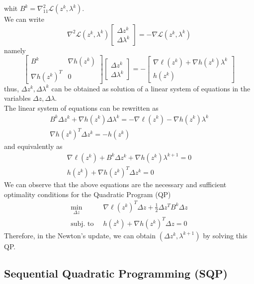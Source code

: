 \documentclass[openany]{book}
\theoremstyle{definition}
\theoremstyle{remark}
\begin{document}
whit $B^k = \nabla_{11}^2 \mathcal{L}(z^k,\lambda^k)$.\\
We can write 
\[
    \nabla^2\mathcal{L}(z^k,\lambda^k)\begin{bmatrix}
        \Delta z^k \\ \Delta \lambda^k
    \end{bmatrix} = -\nabla \mathcal{L}(z^k,\lambda^k)
\]
namely 
\[
    \begin{bmatrix}
        B^k & \nabla h(z^k) \\
        \nabla h(z^k)^T & 0
        \end{bmatrix}  \begin{bmatrix}
        \Delta z^k \\ \Delta \lambda^k
        \end{bmatrix} = -\begin{bmatrix}
        \nabla \ell(z^k)+\nabla h(z^k)\lambda^k \\ h(z^k)
    \end{bmatrix}
\]
thus, $\Delta z^k, \Delta\lambda^k$ can be obtained as solution of a linear system of equations in the variables $\Delta z, \Delta\lambda$.\\
The linear system of equations can be rewritten as 
\begin{gather*}
    B^k\Delta z^k+\nabla h(z^k)\Delta \lambda^k = -\nabla\ell(z^k) - \nabla h(z^k)\lambda^k \\
    \nabla h(z^k)^T \Delta z^k = -h(z^k)
\end{gather*}
and equivalently as 
\begin{gather*}
    \nabla\ell(z^k) +B^k\Delta z^k+\nabla h(z^k)\lambda^{k+1} = 0 \\
    h(z^k)+\nabla h(z^k)^T\Delta z^k = 0
\end{gather*}
We can observe that the above equations are the necessary and sufficient optimality conditions for the Quadratic Program (QP)
\begin{align*}
    \min_{\Delta z}\  &\nabla\ell(z^k)^T\Delta z + \displaystyle\frac{1}{2}\Delta z^T B^k\Delta z \\
    \text{subj. to }\  & h(z^k) + \nabla h(z^k)^T \Delta z = 0
\end{align*}
Therefore, in the Newton's update, we can obtain $(\Delta z^k, \lambda^{k+1})$ by solving this QP.

\subsection{Sequential Quadratic Programming (SQP)}
\end{document}
